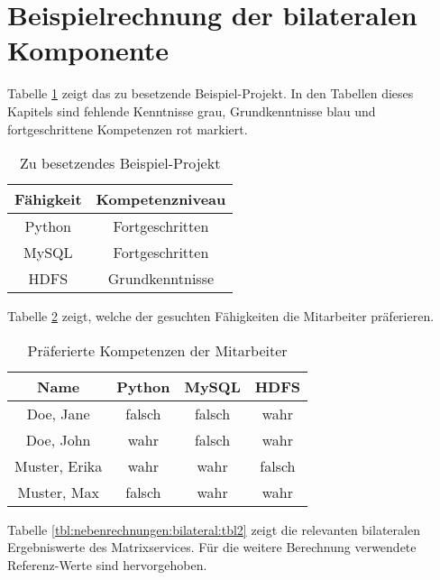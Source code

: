 \section{Beispielrechnung der bilateralen Komponente}
\label{ch:nebenrechnungen:bilateral}
Tabelle \ref{tbl:nebenrechnungen:bilateral:tbl1} zeigt das zu besetzende Beispiel-Projekt. In den Tabellen dieses Kapitels sind fehlende Kenntnisse grau, Grundkenntnisse blau und fortgeschrittene Kompetenzen rot markiert.
\begin{table}[h]
	\centering
	\begin{tabular}{c|c}
		Fähigkeit & Kompetenzniveau \\
		\hline
		Python  & \cellcolor{usercolor}Fortgeschritten\\
		MySQL   & \cellcolor{usercolor}Fortgeschritten\\
		HDFS    & \cellcolor{itemcolor}Grundkenntnisse
	\end{tabular}
	\caption{Zu besetzendes Beispiel-Projekt}
	\label{tbl:nebenrechnungen:bilateral:tbl1}
\end{table}

Tabelle \ref{tbl:nebenrechnungen:bilateral:tbl3} zeigt, welche der gesuchten Fähigkeiten die Mitarbeiter präferieren.
\begin{table}[h]
	\centering
	\begin{tabular}{c|c|c|c}
		Name & Python & MySQL & HDFS \\
		\hline
		Doe, Jane     & \cellcolor{usercolor}falsch & \cellcolor{usercolor}falsch & \cellcolor{itemcolor}wahr\\
		Doe, John     & \cellcolor{itemcolor}wahr   & \cellcolor{itemcolor}falsch   & \cellcolor{itemcolor}wahr\\
		Muster, Erika & \cellcolor{itemcolor}wahr   & \cellcolor{usercolor}wahr & \cellcolor{usercolor}falsch\\
		Muster, Max   & \cellcolor{usercolor}falsch & \cellcolor{itemcolor}wahr   & \cellcolor{itemcolor}wahr
	\end{tabular}
	\caption{Präferierte Kompetenzen der Mitarbeiter}
	\label{tbl:nebenrechnungen:bilateral:tbl3}
\end{table}

Tabelle \ref{tbl:nebenrechnungen:bilateral:tbl2} zeigt die relevanten bilateralen Ergebniswerte des Matrixservices. Für die weitere Berechnung verwendete Referenz-Werte sind hervorgehoben.

